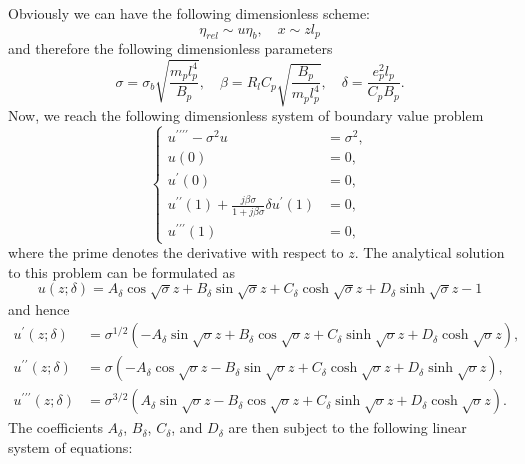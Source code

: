 \documentclass{article}
\begin{document}
Obviously we can have the following dimensionless scheme:
\begin{equation}
    \eta_{rel} \sim u \eta_b ,\quad x \sim z l_p 
\end{equation}
and therefore the following dimensionless parameters
\begin{equation}
    \sigma = \sigma_b \sqrt{\frac{m_p l_p^4}{B_p}}, \quad \beta = R_l C_p \sqrt{\frac{B_p}{m_p l_p^4}}, \quad \delta = \frac{e_p^2 l_p}{C_p B_p}.
\end{equation}
Now, we reach the following dimensionless system of boundary value problem
\begin{equation}
    \left\{\begin{aligned}
        u^{\prime\prime\prime\prime} -\sigma^2 u &= \sigma^2, \\
        u(0) &= 0, \\
        u^{\prime}(0) &= 0, \\
        u^{\prime\prime}(1)  + \frac{j \beta \sigma }{1 + j \beta \sigma } \delta u^{\prime}(1) &= 0, \\
        u^{\prime\prime\prime}(1) &= 0,
    \end{aligned}\right.
\end{equation}
where the prime denotes the derivative with respect to $z$. The analytical solution to this problem can be formulated as
\begin{equation}
    u(z;\delta) = A_\delta \cos{\sqrt{\sigma}z} + B_\delta \sin{\sqrt{\sigma}z} + C_\delta \cosh{\sqrt{\sigma}z} + D_\delta \sinh{\sqrt{\sigma}z} - 1
\end{equation}
and hence
\begin{equation}
    \begin{aligned}
        u^{\prime}(z;\delta) &= \sigma^{1/2} \left( - A_\delta \sin{\sqrt{\sigma}z} + B_\delta \cos{\sqrt{\sigma}z} + C_\delta \sinh{\sqrt{\sigma}z} + D_\delta \cosh{\sqrt{\sigma}z} \right), \\
        u^{\prime\prime}(z;\delta) &= \sigma  \left( - A_\delta \cos{\sqrt{\sigma}z} - B_\delta \sin{\sqrt{\sigma}z} + C_\delta \cosh{\sqrt{\sigma}z} + D_\delta \sinh{\sqrt{\sigma}z} \right), \\
        u^{\prime\prime\prime}(z;\delta) &= \sigma^{3/2} \left( A_\delta \sin{\sqrt{\sigma}z} - B_\delta \cos{\sqrt{\sigma}z} + C_\delta \sinh{\sqrt{\sigma}z} + D_\delta \cosh{\sqrt{\sigma}z} \right). 
    \end{aligned}
\end{equation}
The coefficients $A_\delta$, $B_\delta$, $C_\delta$, and $D_\delta$ are then subject to the following linear system of equations:
\end{document}
